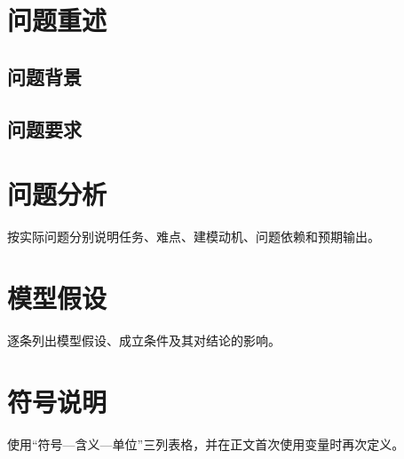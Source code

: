 \begin{abstract}
本文针对……展开研究。摘要应在正文和验证完成后，根据实际问题逐问概括方法、关键结果和验证结论。

\end{abstract}

\section{问题重述}

\subsection{问题背景}

\subsection{问题要求}

\section{问题分析}

按实际问题分别说明任务、难点、建模动机、问题依赖和预期输出。

\section{模型假设}

逐条列出模型假设、成立条件及其对结论的影响。

\section{符号说明}

使用“符号—含义—单位”三列表格，并在正文首次使用变量时再次定义。

